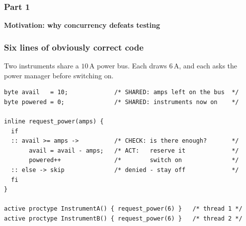 \begin{frame}
  \frametitle{Part 1}

{\Large\bf Motivation: why concurrency defeats testing}

\end{frame}

\begin{frame}[fragile]
  \frametitle{Six lines of obviously correct code} \small

Two instruments share a $10\,$A power bus. Each draws $6\,$A, and each asks the
power manager before switching on.

\begin{lstlisting}[language=promela]
byte avail   = 10;             /* SHARED: amps left on the bus  */
byte powered = 0;              /* SHARED: instruments now on    */

inline request_power(amps) {
  if
  :: avail >= amps ->          /* CHECK: is there enough?       */
       avail = avail - amps;   /* ACT:   reserve it             */
       powered++               /*        switch on              */
  :: else -> skip              /* denied - stay off             */
  fi
}

active proctype InstrumentA() { request_power(6) }   /* thread 1 */
active proctype InstrumentB() { request_power(6) }   /* thread 2 */
\end{lstlisting}

\end{frame}

